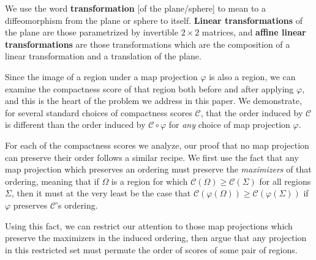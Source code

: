 \begin{definition}
We use the word \textbf{transformation} [of the plane/sphere] to mean
to a diffeomorphism from the plane or sphere to itself.
\textbf{Linear transformations} of the plane are those parametrized by
invertible $2{\times}2$ matrices, and \textbf{affine linear
transformations} are those transformations which are the composition
of a linear transformation and a translation of the plane.
\end{definition}

Since the image of a region under a map projection $\varphi$ is also
a region, we can examine the compactness score of that region both 
before and after applying $\varphi$, and this is the heart of the
problem we address in this paper.  We demonstrate, for several
standard choices of compactness scores $\mathcal{C}$, that the order
induced by $\mathcal{C}$ is different than the order induced by
$\mathcal{C}\circ\varphi$ for \textit{any} choice of map projection
$\varphi$.

For each of the compactness scores we analyze, our proof that no map
projection can preserve their order follows a similar recipe.  We
first use the fact that any map projection which preserves an ordering
must preserve the \textit{maximizers} of that ordering, meaning that
if $\Omega$ is a region for which $\mathcal{C}(\Omega)\geq
\mathcal{C}(\Sigma)$ for all regions $\Sigma$, then it must at the
very least be the case that $\mathcal{C}(\varphi(\Omega))\geq
\mathcal{C}(\varphi(\Sigma))$ if $\varphi$ preserves $\mathcal{C}$'s
ordering.

Using this fact, we can restrict our attention to those map
projections which preserve the maximizers in the induced ordering,
then argue that any projection in this restricted set must permute the
order of scores of some pair of regions.
